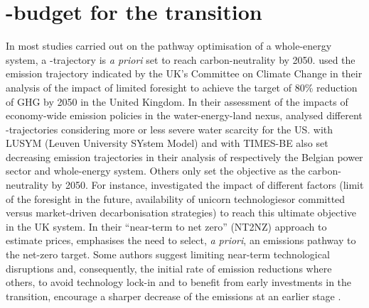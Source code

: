 \section{-budget for the transition}
\label{sec:cs:CO2-budget}
In most studies carried out on the pathway optimisation of a whole-energy system, a -trajectory is \textit{a priori} set to reach carbon-neutrality by 2050. \citet{nerini2017myopic} used the emission trajectory indicated by the UK's Committee on Climate Change in their analysis of the impact of limited foresight to achieve the target of 80\% reduction of \gls{GHG} by 2050 in the United Kingdom. In their assessment of the impacts of economy-wide emission policies in the water-energy-land nexus, \citet{licandeo2023assessing} analysed different -trajectories considering more or less severe water scarcity for the US. \citet{poncelet2016myopic} with LUSYM (Leuven University SYstem Model) and \citet{PATHS2050} with TIMES-BE also set decreasing emission trajectories in their analysis of respectively the Belgian power sector and whole-energy system.  Others only set the objective as the carbon-neutrality by 2050. For instance, \citet{heuberger2018impact} investigated the impact of different factors (\eg limit of the foresight in the future, availability of \og unicorn technologies\fg or committed versus market-driven decarbonisation strategies) to reach this ultimate objective in the UK system. In their ``near-term to net zero'' (NT2NZ) approach to estimate  prices, \citet{kaufman2020near} emphasises the need to select, \textit{a priori}, an emissions pathway to the net-zero target. Some authors suggest limiting near-term technological disruptions and, consequently, the initial rate of emission reductions \cite{wigley1996economic} where others, to avoid technology lock-in and to benefit from early investments in the transition, encourage a sharper decrease of the emissions at an earlier stage \cite{vogt2018starting}.

